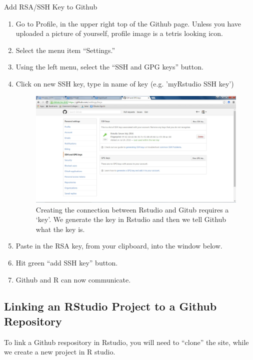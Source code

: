 \documentclass[12pt]{../SOP3_beta}
\begin{document}
\NP Add RSA/SSH Key to Github
  \begin{enumerate}
  \item Go to Profile, in the upper right top of the Github page. Unless you have uploaded a picture of yourself, profile image is a tetris looking icon.
  \item Select the menu item ``Settings.''
  \item Using the left menu, select the ``SSH and GPG keys'' button.
  \item Click on new SSH key, type in name of key (e.g. 'myRstudio SSH key')
  
\begin{figure}
\includegraphics{graphics/Github_SavedSSH.jpg}
\caption{Creating the connection between Rstudio and Gitub requires a `key'. We generate the key in Rstudio and then we tell Github what the key is.}
\end{figure}

  \item Paste in the RSA key, from your clipboard, into the window below.
  \item Hit green ``add SSH key'' button.
  \item Github and R can now communicate.
  \end{enumerate}


\subsection{Linking an RStudio Project to a Github Repository}

\NP To link a Github respository in Rstudio, you will need to ``clone'' the site, while we create a new project in R studio.
\end{document}
